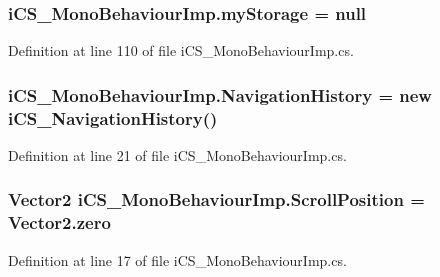 \hypertarget{classi_c_s___mono_behaviour_imp_a7d99bfd829daddc321daeb6ad4080f12}{
\subsubsection[{my\+Storage}]{ i\+C\+S\+\_\+\+Mono\+Behaviour\+Imp.\+my\+Storage = null}}\label{classi_c_s___mono_behaviour_imp_a7d99bfd829daddc321daeb6ad4080f12}


Definition at line 110 of file i\+C\+S\+\_\+\+Mono\+Behaviour\+Imp.\+cs.

\hypertarget{classi_c_s___mono_behaviour_imp_aeea8e6220ce6edee7f258f16a9d9a7cb}{
\subsubsection[{Navigation\+History}]{ i\+C\+S\+\_\+\+Mono\+Behaviour\+Imp.\+Navigation\+History = new {\bf i\+C\+S\+\_\+\+Navigation\+History}()}}\label{classi_c_s___mono_behaviour_imp_aeea8e6220ce6edee7f258f16a9d9a7cb}


Definition at line 21 of file i\+C\+S\+\_\+\+Mono\+Behaviour\+Imp.\+cs.

\hypertarget{classi_c_s___mono_behaviour_imp_a48611eb6a8094ca30921ac13cadc7df0}{
\subsubsection[{Scroll\+Position}]{\setlength{\rightskip}{0pt plus 5cm}Vector2 i\+C\+S\+\_\+\+Mono\+Behaviour\+Imp.\+Scroll\+Position = Vector2.\+zero}}\label{classi_c_s___mono_behaviour_imp_a48611eb6a8094ca30921ac13cadc7df0}


Definition at line 17 of file i\+C\+S\+\_\+\+Mono\+Behaviour\+Imp.\+cs.

